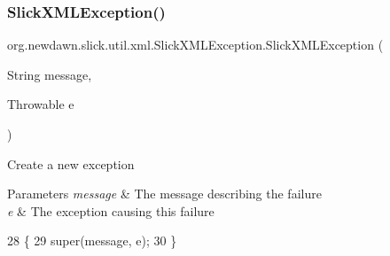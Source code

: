 \subsubsection{\texorpdfstring{Slick\+X\+M\+L\+Exception()}{SlickXMLException()}\hspace{0.1cm}{\footnotesize\ttfamily [2/2]}}
{\footnotesize\ttfamily org.\+newdawn.\+slick.\+util.\+xml.\+Slick\+X\+M\+L\+Exception.\+Slick\+X\+M\+L\+Exception (\begin{DoxyParamCaption}\item[{String}]{message,  }\item[{Throwable}]{e }\end{DoxyParamCaption})\hspace{0.3cm}{\ttfamily [inline]}}

Create a new exception


\begin{DoxyParams}{Parameters}
{\em message} & The message describing the failure \\
\hline
{\em e} & The exception causing this failure \\
\hline
\end{DoxyParams}

\begin{DoxyCode}
28                                                           \{
29         super(message, e);
30     \}
\end{DoxyCode}
